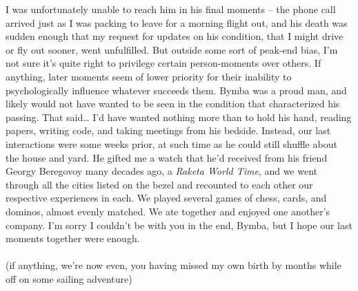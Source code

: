 \documentclass[twoside,10pt]{article}
\begin{document}
\begin{article*}
I was unfortunately unable to reach him in his final moments – the phone call arrived just as I was packing to leave for a morning flight out, and his death was sudden enough that my request for updates on his condition, that I might drive or fly out sooner, went unfulfilled. But outside some sort of peak-end bias, I’m not sure it’s quite right to privilege certain person-moments over others. If anything, later moments seem of lower priority for their inability to psychologically influence whatever succeeds them. Bymba was a proud man, and likely would not have wanted to be seen in the condition that characterized his passing. That said… I’d have wanted nothing more than to hold his hand, reading papers, writing code, and taking meetings from his bedside. Instead, our last interactions were some weeks prior, at such time as he could still shuffle about the house and yard. He gifted me a watch that he’d received from his friend Georgy Beregovoy many decades ago, a \textit{Raketa World Time}, and we went through all the cities listed on the bezel and recounted to each other our respective experiences in each. We played several games of chess, cards, and dominos, almost evenly matched. We ate together and enjoyed one another’s company. I’m sorry I couldn’t be with you in the end, Bymba, but I hope our last moments together were enough.
\\\\
(if anything, we’re now even, you having missed my own birth by months while off on some sailing adventure)
\\\\

\end{article*}
\end{document}
